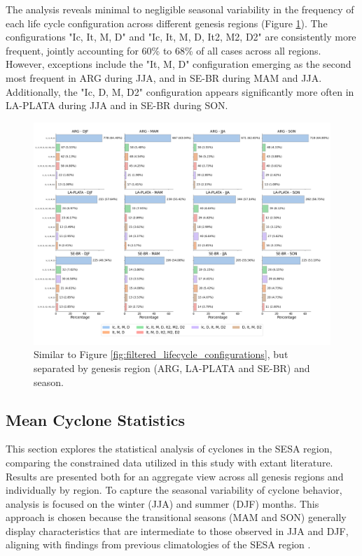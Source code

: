 The analysis reveals minimal to negligible seasonal variability in the frequency of each life cycle configuration across different genesis regions (Figure \ref{fig:lifecycle_configurations_seasonal_variability}). The configurations "Ic, It, M, D" and "Ic, It, M, D, It2, M2, D2" are consistently more frequent, jointly accounting for 60\% to 68\% of all cases across all regions. However, exceptions include the "It, M, D" configuration emerging as the second most frequent in ARG during JJA, and in SE-BR during MAM and JJA. Additionally, the "Ic, D, M, D2" configuration appears significantly more often in LA-PLATA during JJA and in SE-BR during SON.


\begin{figure}[h!]
\centering
\includegraphics[width=\textwidth]{figs_4/multi_panel_barplots_filtered.png}
\caption[Life cycle configurations by regions and season]{Similar to Figure \ref{fig:filtered_lifecycle_configurations}, but separated by genesis region (ARG, LA-PLATA and SE-BR) and season.}
\label{fig:lifecycle_configurations_seasonal_variability}
\end{figure}


\subsection{Mean Cyclone Statistics}
\label{sec:cyclone_statistics}

This section explores the statistical analysis of cyclones in the SESA region, comparing the constrained data utilized in this study with extant literature. Results are presented both for an aggregate view across all genesis regions and individually by region. To capture the seasonal variability of cyclone behavior, analysis is focused on the winter (JJA) and summer (DJF) months. This approach is chosen because the transitional seasons (MAM and SON) generally display characteristics that are intermediate to those observed in JJA and DJF, aligning with findings from previous climatologies of the SESA region \citep[e.g.]{gan1991surface, reboita2010south, crespo2021potential}. 

